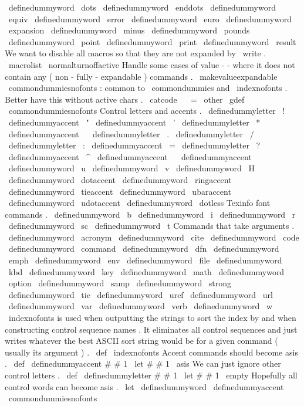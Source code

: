 {{\
definedummyword
\
dots
\
definedummyword
\
enddots
\
definedummyword
\
equiv
\
definedummyword
\
error
\
definedummyword
\
euro
\
definedummyword
\
expansion
\
definedummyword
\
minus
\
definedummyword
\
pounds
\
definedummyword
\
point
\
definedummyword
\
print
\
definedummyword
\
result
%
%
We
want
to
disable
all
macros
so
that
they
are
not
expanded
by
\
write
.
\
macrolist
%
\
normalturnoffactive
%
%
Handle
some
cases
of
value
-
-
where
it
does
not
contain
any
%
(
non
-
fully
-
expandable
)
commands
.
\
makevalueexpandable
}
%
\
commondummiesnofonts
:
common
to
\
commondummies
and
\
indexnofonts
.
%
%
Better
have
this
without
active
chars
.
{
\
catcode
\
~
=
\
other
\
gdef
\
commondummiesnofonts
{
%
%
Control
letters
and
accents
.
\
definedummyletter
\
!
%
\
definedummyaccent
\
"
%
\
definedummyaccent
\
'
%
\
definedummyletter
\
*
%
\
definedummyaccent
\
%
\
definedummyletter
\
.
%
\
definedummyletter
\
/
%
\
definedummyletter
\
:
%
\
definedummyaccent
\
=
%
\
definedummyletter
\
?
%
\
definedummyaccent
\
^
%
\
definedummyaccent
\
%
\
definedummyaccent
\
~
%
\
definedummyword
\
u
\
definedummyword
\
v
\
definedummyword
\
H
\
definedummyword
\
dotaccent
\
definedummyword
\
ringaccent
\
definedummyword
\
tieaccent
\
definedummyword
\
ubaraccent
\
definedummyword
\
udotaccent
\
definedummyword
\
dotless
%
%
Texinfo
font
commands
.
\
definedummyword
\
b
\
definedummyword
\
i
\
definedummyword
\
r
\
definedummyword
\
sc
\
definedummyword
\
t
%
%
Commands
that
take
arguments
.
\
definedummyword
\
acronym
\
definedummyword
\
cite
\
definedummyword
\
code
\
definedummyword
\
command
\
definedummyword
\
dfn
\
definedummyword
\
emph
\
definedummyword
\
env
\
definedummyword
\
file
\
definedummyword
\
kbd
\
definedummyword
\
key
\
definedummyword
\
math
\
definedummyword
\
option
\
definedummyword
\
samp
\
definedummyword
\
strong
\
definedummyword
\
tie
\
definedummyword
\
uref
\
definedummyword
\
url
\
definedummyword
\
var
\
definedummyword
\
verb
\
definedummyword
\
w
}
}
%
\
indexnofonts
is
used
when
outputting
the
strings
to
sort
the
index
%
by
and
when
constructing
control
sequence
names
.
It
eliminates
all
%
control
sequences
and
just
writes
whatever
the
best
ASCII
sort
string
%
would
be
for
a
given
command
(
usually
its
argument
)
.
%
\
def
\
indexnofonts
{
%
%
Accent
commands
should
become
asis
.
\
def
\
definedummyaccent
#
#
1
{
\
let
#
#
1
\
asis
}
%
%
We
can
just
ignore
other
control
letters
.
\
def
\
definedummyletter
#
#
1
{
\
let
#
#
1
\
empty
}
%
%
Hopefully
all
control
words
can
become
asis
.
\
let
\
definedummyword
\
definedummyaccent
%
\
commondummiesnofonts
}}
